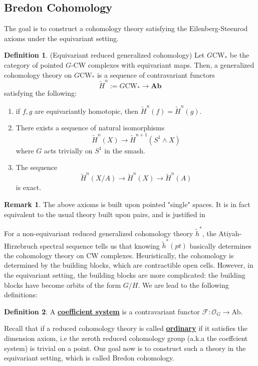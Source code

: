 \documentclass{article}
\theoremstyle{definition}
\theoremstyle{definition}
\newtheorem{definition}{Definition}[theorem]
\theoremstyle{definition}
\newtheorem{remark}{Remark}[theorem]
\theoremstyle{definition}
\theoremstyle{definition}
\theoremstyle{definition}
\theoremstyle{definition}
\begin{document}
\subsection{Bredon Cohomology}  
The goal is to construct a cohomology theory satisfying the Eilenberg-Steenrod axioms under the equivariant setting. 
 \begin{tcolorbox}[colback=purple!5!white,colframe=purple!75!black]
 \begin{definition}
 (Equivariant reduced generalized cohomology) Let $G\textrm{CW}_*$ be the category of pointed $G$-CW complexes with equivariant maps. Then, a generalized cohomology theory on $G\textrm{CW}_*$ is a sequence of contravariant functors 
 \[\tilde{H}^n:=G\textrm{CW}_*\to \textbf{Ab} \]
 satisfying the following:
 \begin{enumerate}
    \item if $f,g$ are equivariantly homotopic, then $\tilde{H}^n(f)=\tilde{H}^n(g)$.
    \item There exists a sequence of natural isomorphisms
   \[\tilde{H}^n(X)\to \tilde{H}^{n+1}(S^1\wedge X)\]
   where $G$ acts trivially on $S^1$ in the smash. 
    \item The sequence 
    \[\tilde{H}^n(X/A)\to \tilde{H}^n(X)\to \tilde{H}^n(A)\]
    is exact.
 \end{enumerate}
 \end{definition}
 \end{tcolorbox}

\begin{tcolorbox}[colback=green!5!white,colframe=green!30!white]
\begin{remark}
The above axioms is built upon pointed "single" spaces. It is in fact equivalent to the usual theory built upon pairs, and is justified in 
\end{remark}
\end{tcolorbox}
For a non-equivariant reduced generalized cohomology theory $\tilde{h}^*$, the Atiyah-Hirzebruch spectral sequence tells us that knowing $\tilde{h}^*(pt)$ basically determines the cohomology theory on CW complexes. Heuristically, the cohomology is determined by the building blocks, which are contractible open cells. However, in the equivariant setting, the building blocks are more complicated: the building blocks have become orbits of the form $G/H$. We are lead to the following definitions:

\begin{tcolorbox}[colback=purple!5!white,colframe=purple!75!black]
\begin{definition}
A \underline{\textbf{coefficient system}} is a contravariant functor $\mathcal{F}: \mathcal{O}_G\to \textrm{Ab}$.
\end{definition}
\end{tcolorbox}
Recall that if a reduced cohomology theory is called \underline{\textbf{ordinary}} if it satisfies the dimension axiom, i.e the zeroth reduced cohomology group (a.k.a the coeffcient system) is trivial on a point. Our goal now is to construct such a theory in the equivariant setting, which is called Bredon cohomology. 
\end{document}
